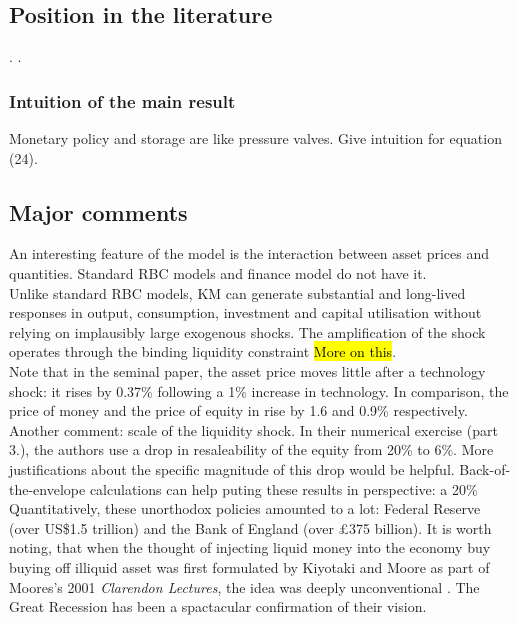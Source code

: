 \documentclass{amsart}
\theoremstyle{definition}
\theoremstyle{remark}
\numberwithin{equation}{section}
\begin{document}
\subsection*{Position in the literature}. \cite{gertler2016wholesale}.

\subsubsection*{Intuition of the main result}

Monetary policy and storage are like pressure valves. Give intuition for equation (24).

\subsection*{Major comments} An interesting feature of the model is the interaction between asset prices and quantities. Standard RBC models and finance model do not have it.\\

Unlike standard RBC models, KM can generate substantial and long-lived responses in output, consumption, investment and capital utilisation without relying on implausibly large exogenous shocks. The amplification of the shock operates through the binding liquidity constraint \hl{More on this}.\\

Note that in the seminal \cite{kiyotaki1997credit} paper, the asset price moves little after a technology shock: it rises by 0.37\% following a 1\% increase in technology. In comparison, the price of money and the price of equity in \cite{kiyotaki2019liquidity} rise by 1.6 and 0.9\% respectively.\\

Another comment: scale of the liquidity shock. In their numerical exercise (part 3.), the authors use a drop in resaleability of the equity from 20\% to 6\%. More justifications about the specific magnitude of this drop would be helpful. Back-of-the-envelope calculations can help puting these results in perspective: a 20\% \\

Quantitatively, these unorthodox policies amounted to a lot: Federal Reserve (over US\$1.5 trillion) and the Bank of England (over £375 billion). It is worth noting, that when the thought of injecting liquid money into the economy buy buying off illiquid asset was first formulated by Kiyotaki and Moore as part of Moores's 2001 \textit{Clarendon Lectures}, the idea was deeply unconventional \citep{kiyotaki2001liquidity}. The Great Recession has been a spactacular confirmation of their vision.\\
\end{document}
